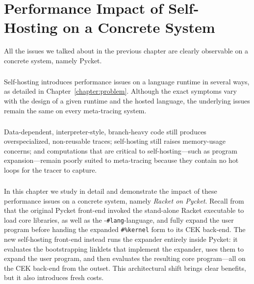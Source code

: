 \chapter{Performance Impact of Self-Hosting on a Concrete System}

	\label{chapter:analysis}

	\begin{chapterpoint}
		All the issues we talked about in the previous chapter are clearly observable on a concrete system, namely Pycket.
	\end{chapterpoint}

	\paragraph{}%
	 	Self-hosting introduces performance issues on a language runtime in several ways, as detailed in Chapter~\ref{chapter:problem}. Although the exact symptoms vary with the design of a given runtime and the hosted language, the underlying issues remain the same on every meta-tracing system.

	\paragraph{}%
	 	Data-dependent, interpreter-style, branch-heavy code still produces overspecialized, non-reusable traces; self-hosting still raises memory-usage concerns; and computations that are critical to self-hosting—such as program expansion—remain poorly suited to meta-tracing because they contain no hot loops for the tracer to capture.

	\paragraph{}%
	 	In this chapter we study in detail and demonstrate the impact of these performance issues on a concrete system, namely \emph{Racket on Pycket}. Recall from  that the original Pycket front-end invoked the stand-alone Racket executable to load core libraries, as well as the -\verb|#lang|-language, and fully expand the user program before handing the expanded \verb|#%kernel| form to its CEK back-end. The new self-hosting front-end instead runs the expander entirely inside Pycket: it evaluates the bootstrapping linklets that implement the expander, uses them to expand the user program, and then evaluates the resulting core program—all on the CEK back-end from the outset. This architectural shift brings clear benefits, but it also introduces fresh costs.

